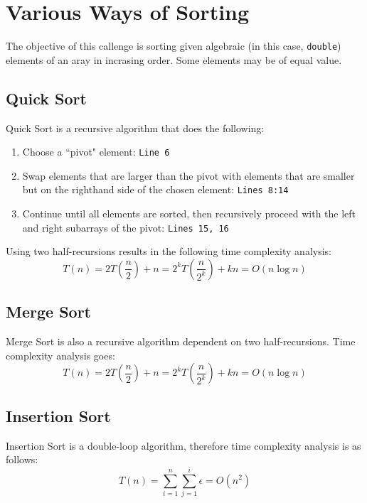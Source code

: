 \chapter{Various Ways of Sorting}
The objective of this callenge is sorting given algebraic (in this case,
\texttt{double}) elements of an aray in incrasing order. Some elements may be of
equal value.

\section{Quick Sort}
Quick Sort is a recursive algorithm that does the following:
\begin{enumerate}
\item Choose a ``pivot" element: \texttt{Line 6}
\item Swap elements that are larger than the pivot with elements that are
    smaller but on the righthand side of the chosen element: \texttt{Lines 8:14}
\item Continue until all elements are sorted, then recursively proceed with the
    left and right subarrays of the pivot: \texttt{Lines 15, 16}
\end{enumerate}
Using two half-recursions results in the following time complexity analysis: \[
T(n)=2T\left(\frac{n}{2}\right)+n=2^kT\left(\frac{n}{2^k}\right)+kn=O(n\log n)\]

\section{Merge Sort}
Merge Sort is also a recursive algorithm dependent on two half-recursions. Time
complexity analysis goes: \[ T(n)=2T\left(\frac{n}{2}\right)+n=2^kT\left(\frac
{n}{2^k}\right)+kn=O(n\log n) \]

\section{Insertion Sort}
Insertion Sort is a double-loop algorithm, therefore time complexity analysis is
as follows: \[ T(n)=\sum_{i=1}^n\sum_{j=1}^i\epsilon=O(n^2) \]

